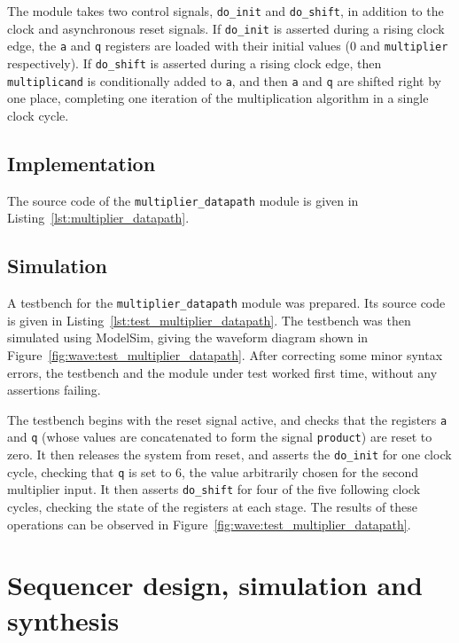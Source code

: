 \documentclass[a4paper]{article}
\begin{document}
The module takes two control signals, \texttt{do\_init} and \texttt{do\_shift}, in addition to the clock and asynchronous reset signals. If \texttt{do\_init} is asserted during a rising clock edge, the \texttt{a} and \texttt{q} registers are loaded with their initial values (0 and \texttt{multiplier} respectively). If \texttt{do\_shift} is asserted during a rising clock edge, then \texttt{multiplicand} is conditionally added to \texttt{a}, and then \texttt{a} and \texttt{q} are shifted right by one place, completing one iteration of the multiplication algorithm in a single clock cycle.

\subsection{Implementation}
\label{sec:reg:impl}

The source code of the \texttt{multiplier\_datapath} module is given in Listing~\ref{lst:multiplier_datapath}.

\subsection{Simulation}
\label{sec:reg:sim}

A testbench for the \texttt{multiplier\_datapath} module was prepared. Its source code is given in Listing~\ref{lst:test_multiplier_datapath}. The testbench was then simulated using ModelSim, giving the waveform diagram shown in Figure~\ref{fig:wave:test_multiplier_datapath}. After correcting some minor syntax errors, the testbench and the module under test worked first time, without any assertions failing.

The testbench begins with the reset signal active, and checks that the registers \texttt{a} and \texttt{q} (whose values are concatenated to form the signal \texttt{product}) are reset to zero. It then releases the system from reset, and asserts the \texttt{do\_init} for one clock cycle, checking that \texttt{q} is set to 6, the value arbitrarily chosen for the second multiplier input. It then asserts \texttt{do\_shift} for four of the five following clock cycles, checking the state of the registers at each stage. The results of these operations can be observed in Figure~\ref{fig:wave:test_multiplier_datapath}.

\section{Sequencer design, simulation and synthesis}
\label{sec:seq}
\end{document}
